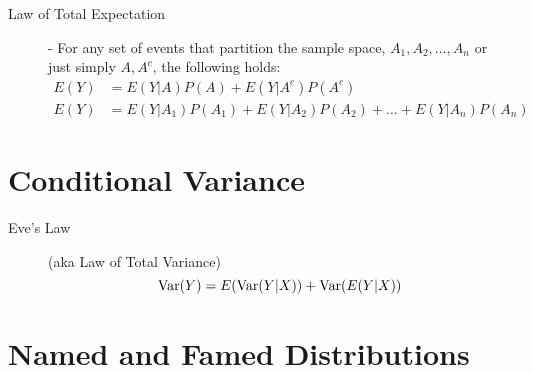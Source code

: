 \documentclass[11pt]{article}
\theoremstyle{definition}
\theoremstyle{remark}
\renewcommand{\var}{\textnormal{Var}}
\begin{document}
\begin{description}
	\item[Law of Total Expectation] - For any set of events that partition the sample space, $A_1, A_2, \dots, A_n$ or just simply $A, A^c$, the following holds:
	\begin{align*}
		E(Y) &= E(Y|A)P(A) + E(Y|A^c)P(A^c) \\
		E(Y) &= E(Y|A_1)P(A_1) + E(Y|A_2)P(A_2) + \dots + E(Y|A_n)P(A_n)
	\end{align*}
\end{description}
\section{Conditional Variance}
\begin{description}
	\item[Eve's Law] (aka Law of Total Variance) \quad
	\[\var(Y) = E(\var(Y|X)) + \var(E(Y|X))\]
\end{description}

\pagebreak
\section{Named and Famed Distributions}
\end{document}
